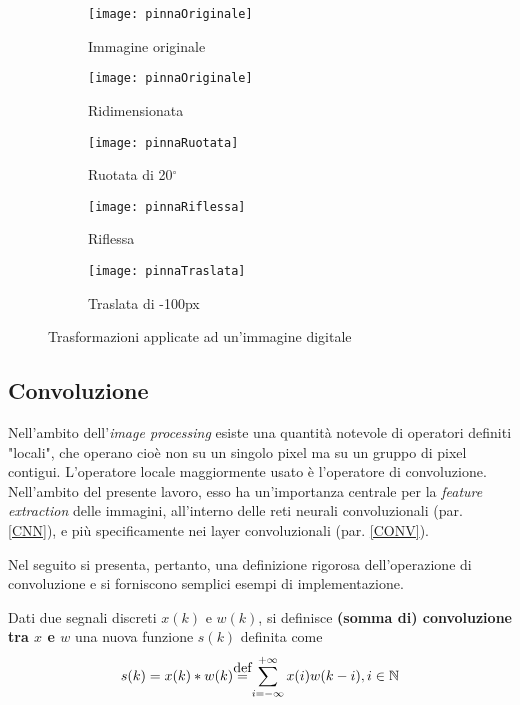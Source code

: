 \begin{figure}[h]
\centering

\begin{subfigure}[b]{\textwidth}
\centering
\texttt{[image: pinnaOriginale]}
\caption{Immagine originale}
\end{subfigure}

\begin{subfigure}[b]{0.24\textwidth}
\centering
\texttt{[image: pinnaOriginale]}
\caption{Ridimensionata}
\end{subfigure}
\begin{subfigure}[b]{0.24\textwidth}
\centering
\texttt{[image: pinnaRuotata]}
\caption{Ruotata di 20$^\circ$}
\end{subfigure}
\begin{subfigure}[b]{0.24\textwidth}
\centering
\texttt{[image: pinnaRiflessa]}
\caption{Riflessa}
\end{subfigure}
\begin{subfigure}[b]{0.24\textwidth}
\centering
\texttt{[image: pinnaTraslata]}
\caption{Traslata di -100px}
\end{subfigure}

\caption{Trasformazioni applicate ad un'immagine digitale}
\label{fig:trasformazioni}
\end{figure}

\subsection{Convoluzione}
\label{convoluzione}
Nell’ambito dell’\textit{image processing} esiste una quantità notevole di operatori definiti "locali", che operano cioè non su un singolo pixel ma su un gruppo di pixel contigui.
L’operatore locale maggiormente usato è l’operatore di convoluzione. Nell'ambito del presente lavoro, esso ha un'importanza centrale per la \textit{feature extraction} delle immagini, all'interno delle reti neurali convoluzionali (par. \ref{CNN}), e più specificamente nei layer convoluzionali (par. \ref{CONV}).


Nel seguito si presenta, pertanto, una definizione rigorosa dell'operazione di convoluzione e si forniscono semplici esempi di implementazione.

Dati due segnali discreti $x(k)$ e $w(k)$, si definisce \textbf{(somma di) convoluzione tra $x$ e $w$} una nuova funzione $s(k)$ definita come \begin{equation*}
s(k)=x(k)\ast w(k)\eqdef \sum_{i=-\infty}^{+\infty}x(i)w(k-i), i\in\Z
\end{equation*}

